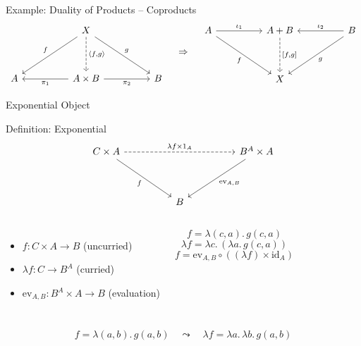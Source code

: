 \documentclass[aspectratio=169]{beamer}
\newcommand{\id}{\mathrm{id}}
\begin{document}
\begin{frame}[fragile]{Example: Duality of Products -- Coproducts}
  \[
    \begin{tikzcd}[row sep=huge, column sep=huge]
      & X \arrow[dl, "f"'] \arrow[dr, "g"] \arrow[d, dashrightarrow, "{\langle f,g \rangle}"] & \\
      A & { A \times B } \arrow[l, "\pi_1"] \arrow[r, "\pi_2"'] & B
    \end{tikzcd}
    \quad \Rightarrow \quad
    \begin{tikzcd}[row sep=huge, column sep=huge]
      A \arrow[r, "\iota_1"] \arrow[dr, "f"'] & A + B \arrow[d, dashrightarrow, "{[f,g]}"] & B \arrow[l, "\iota_2"'] \arrow[dl, "g"] \\
      & X &
    \end{tikzcd}
  \]
\end{frame}

\begin{frame}[fragile]{Exponential Object}
  \begin{block}{Definition: Exponential}
  \[
    \begin{tikzcd}[row sep=huge, column sep=huge]
      C \times A \ar[rr, dashed, "\lambda f \times 1_A"] \ar[dr, "f"'] & & B^{A} \times A \ar[dl, "\mathrm{ev}_{A,B}"] \\
      & B &
    \end{tikzcd}
  \]
  \end{block}
  \begin{columns}
    \begin{itemize}
      \item $f : C \times A \to B$ \hfill (uncurried)
      \item $\lambda f : C \to B^A$ \hfill (curried)
      \item $\mathrm{ev}_{A,B} : B^A \times A \to B$ \hfill (evaluation)
    \end{itemize}
    \[
      f = \lambda (c,a).\, g(c,a)
    \]
    \[
      \lambda f = \lambda c.\, (\lambda a.\, g(c,a))
    \]
    \[
      f = \mathrm{ev}_{A,B} \circ ((\lambda f) \times \id_A)
    \] 
  \end{columns}

\[
  f = \lambda (a,b).\, g(a,b)
  \quad\leadsto\quad
  \lambda f = \lambda a.\,\lambda b.\, g(a,b)
\]
\end{frame}
\end{document}
